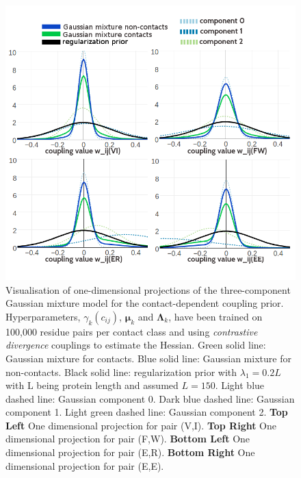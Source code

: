 \documentclass[11pt,a4paper,twoside]{book}
\newcommand{\eq}{\!=\!}
\newcommand{\Lk}{\mathbf{\Lambda}_k}
\newcommand{\muk}{\mathbf{\mu}_k}
\newcommand{\cij}{c_{ij}}
\theoremstyle{definition}
\theoremstyle{definition}
\theoremstyle{remark}
\begin{document}
\begin{figure}
\includegraphics[width=1\linewidth]{img/bayesian_model/cd/3/1dvis_combined_100k} \caption{Visualisation of one-dimensional
projections of the three-component Gaussian mixture model for the
contact-dependent coupling prior. Hyperparameters, \(\gamma_k(\cij)\),
\(\muk\) and \(\Lk\), have been trained on 100,000 residue pairs per
contact class and using \emph{contrastive divergence} couplings to
estimate the Hessian. Green solid line: Gaussian mixture for contacts.
Blue solid line: Gaussian mixture for non-contacts. Black solid line:
regularization prior with \(\lambda_1 \eq 0.2L\) with L being protein
length and assumed \(L\eq150\). Light blue dashed line: Gaussian
component 0. Dark blue dashed line: Gaussian component 1. Light green
dashed line: Gaussian component 2. \textbf{Top Left} One dimensional
projection for pair (V,I). \textbf{Top Right} One dimensional projection
for pair (F,W). \textbf{Bottom Left} One dimensional projection for pair
(E,R). \textbf{Bottom Right} One dimensional projection for pair (E,E).}\label{fig:vis1d-cd-3comp-100k}
\end{figure}
\end{document}
